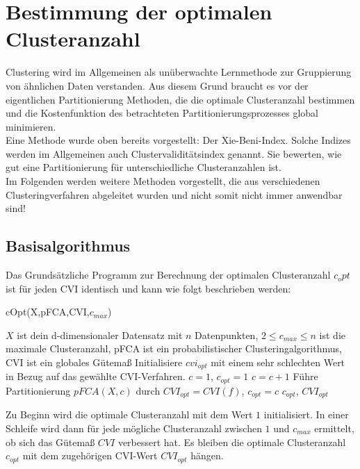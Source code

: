 \documentclass[11pt,ceqn]{book}
\begin{document}
\section{Bestimmung der optimalen Clusteranzahl}
Clustering wird im Allgemeinen als unüberwachte Lernmethode zur Gruppierung von ähnlichen Daten verstanden. Aus diesem Grund braucht es vor der eigentlichen Partitionierung Methoden, die die optimale Clusteranzahl bestimmen und die Kostenfunktion des betrachteten Partitionierungsprozesses global minimieren.
\\
Eine Methode wurde oben bereits vorgestellt: Der Xie-Beni-Index. Solche Indizes werden im Allgemeinen auch Clustervaliditätsindex genannt. Sie bewerten, wie gut eine Partitionierung für unterschiedliche Clusteranzahlen ist.
\\
Im Folgenden werden weitere Methoden vorgestellt, die aus verschiedenen Clusteringverfahren abgeleitet wurden und nicht somit nicht immer anwendbar sind!

\subsection{Basisalgorithmus}
Das Grundsätzliche Programm zur Berechnung der optimalen Clusteranzahl $c_opt$ ist für jeden CVI identisch und kann wie folgt beschrieben werden:

\begin{algorithm}[H]
\caption{cOpt(X,pFCA,CVI,$c_{max}$)}\label{cvibase}
\begin{algorithmic}[1]
\Require $X$ ist dein d-dimensionaler Datensatz mit $n$ Datenpunkten, $2\leqslant c_{max} \leqslant n$ ist die maximale Clusteranzahl, pFCA ist ein probabilistischer Clusteringalgorithmus, CVI ist ein globales Gütemaß
\State Initialisiere $cvi_{opt}$ mit einem sehr schlechten Wert in Bezug auf das gewählte CVI-Verfahren.
\State $c=1$, $c_{opt} = 1$
\Repeat
\State $c=c+1$
\State Führe Partitionierung $pFCA(X,c)$ durch
\State $CVI_{opt} = CVI(f)$, $c_{opt} = c$
\EndIf
{}
\State \Return $c_{opt}$, $CVI_{opt}$
\end{algorithmic}
\end{algorithm} 

Zu Beginn wird die optimale Clusteranzahl mit dem Wert $1$ initialisiert. In einer Schleife wird dann für jede mögliche Clusteranzahl zwischen $1$ und $c_{max}$ ermittelt, ob sich das Gütemaß $CVI$ verbessert hat. Es bleiben die optimale Clusteranzahl $c_{opt}$ mit dem zugehörigen CVI-Wert $CVI_{opt}$ hängen.  
\end{document}
